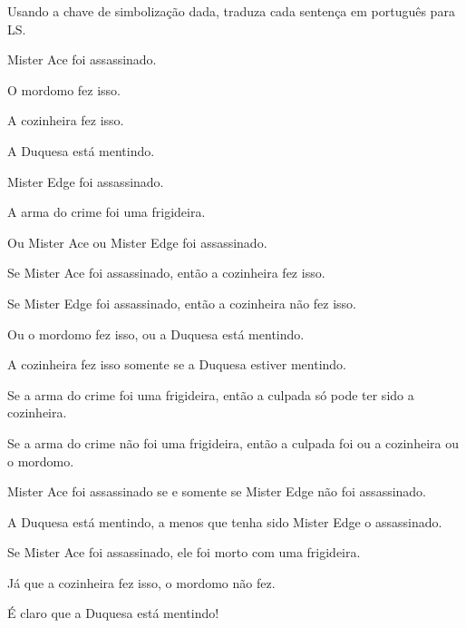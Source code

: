 \problempart Usando a chave de simbolização dada, traduza cada sentença em português para LS.
\begin{ekey}
\item[A:] Mister Ace foi assassinado.
\item[B:] O mordomo fez isso.
\item[C:] A cozinheira fez isso.
\item[D:] A Duquesa está mentindo.
\item[E:] Mister Edge foi assassinado.
\item[F:] A arma do crime foi uma frigideira.
\end{ekey}
\begin{earg}
\item Ou Mister Ace ou Mister Edge foi assassinado.
\item Se Mister Ace foi assassinado, então a cozinheira fez isso.
\item Se Mister Edge foi assassinado, então a cozinheira não fez isso.
\item Ou o mordomo fez isso, ou a Duquesa está mentindo.
\item A cozinheira fez isso somente se a Duquesa estiver mentindo.
\item Se a arma do crime foi uma frigideira, então a culpada só pode ter sido a cozinheira.
\item Se a arma do crime não foi uma frigideira, então a culpada foi ou a cozinheira ou o mordomo.
\item Mister Ace foi assassinado se e somente se Mister Edge não foi assassinado.
\item A Duquesa está mentindo, a menos que tenha sido Mister Edge o assassinado.
\item Se Mister Ace foi assassinado, ele foi morto com uma frigideira.
\item Já que a cozinheira fez isso, o mordomo não fez.
\item É claro que a Duquesa está mentindo!
\end{earg}



